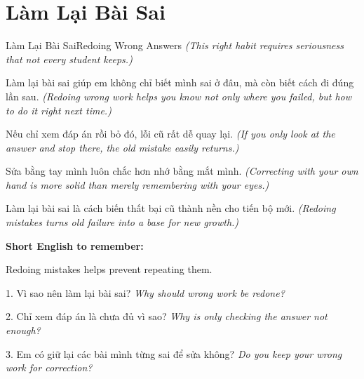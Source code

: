 \section{Làm Lại Bài Sai}
\begin{truyen}{Làm Lại Bài Sai}{Redoing Wrong Answers}
\textit{(This right habit requires seriousness that not every student keeps.)}

Làm lại bài sai giúp em không chỉ biết mình sai ở đâu, mà còn biết cách đi đúng lần sau.
\textit{(Redoing wrong work helps you know not only where you failed, but how to do it right next time.)}

Nếu chỉ xem đáp án rồi bỏ đó, lỗi cũ rất dễ quay lại.
\textit{(If you only look at the answer and stop there, the old mistake easily returns.)}

Sửa bằng tay mình luôn chắc hơn nhớ bằng mắt mình.
\textit{(Correcting with your own hand is more solid than merely remembering with your eyes.)}
\end{truyen}

\begin{baihoc}
Làm lại bài sai là cách biến thất bại cũ thành nền cho tiến bộ mới.
\textit{(Redoing mistakes turns old failure into a base for new growth.)}
\end{baihoc}

\begin{ghinhoanh}
\textbf{Short English to remember:}

Redoing mistakes helps prevent repeating them.

\end{ghinhoanh}

\begin{tuhocnhanh}
1. Vì sao nên làm lại bài sai? \textit{Why should wrong work be redone?}

2. Chỉ xem đáp án là chưa đủ vì sao? \textit{Why is only checking the answer not enough?}

3. Em có giữ lại các bài mình từng sai để sửa không? \textit{Do you keep your wrong work for correction?}
\end{tuhocnhanh}
\ngancach

